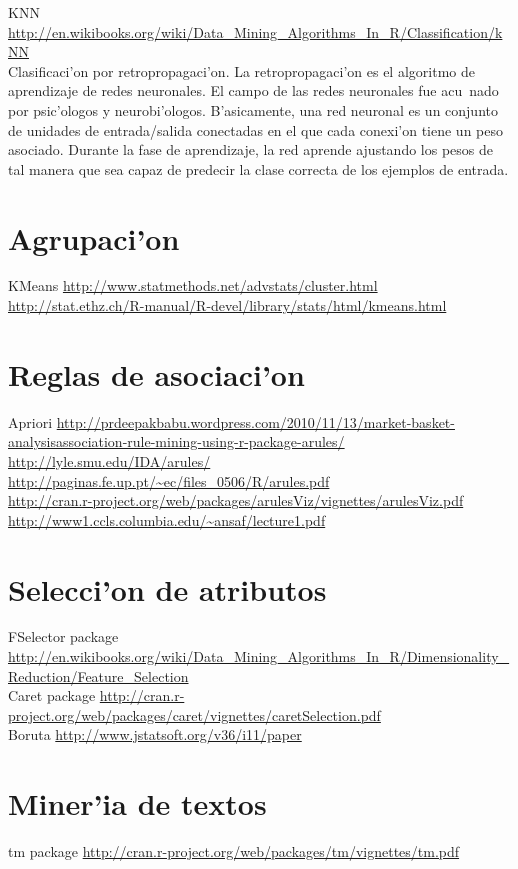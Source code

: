 KNN \url{http://en.wikibooks.org/wiki/Data_Mining_Algorithms_In_R/Classification/kNN}\\
Clasificaci'on por retropropagaci'on. La retropropagaci'on es el algoritmo de aprendizaje de redes neuronales. El campo de las redes neuronales fue acu~nado por psic'ologos y neurobi'ologos. B'asicamente, una red neuronal es un conjunto de unidades de entrada/salida conectadas en el que cada conexi'on tiene un peso asociado. Durante la fase de aprendizaje, la red aprende ajustando los pesos de tal manera que sea capaz de predecir la clase correcta de los ejemplos de entrada.

\section{Agrupaci'on}
KMeans \url{http://www.statmethods.net/advstats/cluster.html}\\
\url{http://stat.ethz.ch/R-manual/R-devel/library/stats/html/kmeans.html}\\
\section{Reglas de asociaci'on}

Apriori \url{http://prdeepakbabu.wordpress.com/2010/11/13/market-basket-analysisassociation-rule-mining-using-r-package-arules/}\\
\url{http://lyle.smu.edu/IDA/arules/}\\
\url{http://paginas.fe.up.pt/~ec/files_0506/R/arules.pdf}\\
\url{http://cran.r-project.org/web/packages/arulesViz/vignettes/arulesViz.pdf}\\
\url{http://www1.ccls.columbia.edu/~ansaf/lecture1.pdf}\\
\section{Selecci'on de atributos}

FSelector package \url{http://en.wikibooks.org/wiki/Data_Mining_Algorithms_In_R/Dimensionality_Reduction/Feature_Selection}\\

Caret package \url{http://cran.r-project.org/web/packages/caret/vignettes/caretSelection.pdf}\\

Boruta \url{http://www.jstatsoft.org/v36/i11/paper}\\
\section{Miner'ia de textos}
tm package \url{http://cran.r-project.org/web/packages/tm/vignettes/tm.pdf}\\


